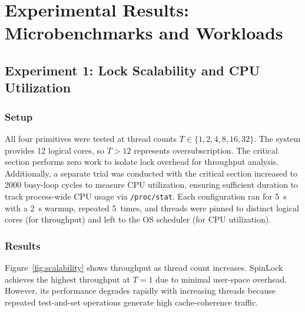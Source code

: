 \documentclass[conference]{IEEEtran}
\begin{document}

\section{Experimental Results: Microbenchmarks and Workloads}
\label{sec:results}

\subsection{Experiment 1: Lock Scalability and CPU Utilization}

\subsubsection{Setup}
All four primitives were tested at thread counts $T \in \{1,2,4,8,16,32\}$. The system provides 12 logical cores, so $T > 12$ represents oversubscription. The critical section performs zero work to isolate lock overhead for throughput analysis. Additionally, a separate trial was conducted with the critical section increased to 2000 busy-loop cycles to measure CPU utilization, ensuring sufficient duration to track process-wide CPU usage via \texttt{/proc/stat}. Each configuration ran for 5~s with a 2~s warmup, repeated 5~times, and threads were pinned to distinct logical cores (for throughput) and left to the OS scheduler (for CPU utilization).

\subsubsection{Results}
Figure~\ref{fig:scalability} shows throughput as thread count increases. 
SpinLock achieves the highest throughput at $T=1$ due to minimal user-space overhead. 
However, its performance degrades rapidly with increasing threads because repeated 
test-and-set operations generate high cache-coherence traffic.
\end{document}
